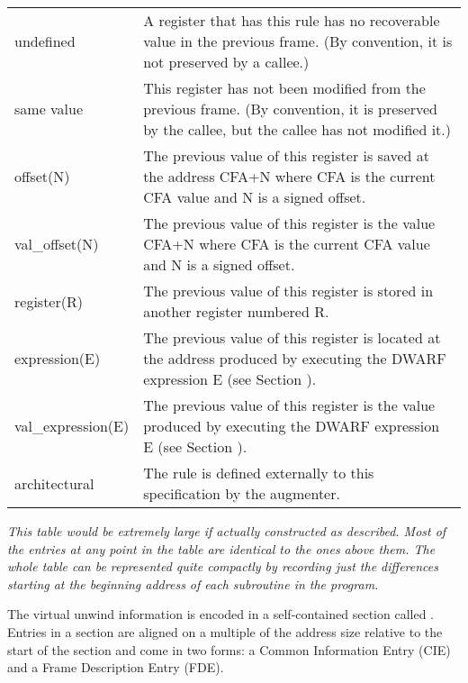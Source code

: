 \begin{longtable}{lp{8cm}}
undefined 
&A register that has this rule has no recoverable value in the previous frame.
(By convention, it is not preserved by a callee.) \\

same value
&This register has not been modified from the previous frame. (By convention,
it is preserved by the callee, but the callee has not modified it.) \\

offset(N)
&The previous value of this register is saved at the address CFA+N where CFA
is the current CFA value and N is a signed offset.\\

val\_offset(N)
&The previous value of this register is the value CFA+N where CFA is the
current CFA value and N is a signed offset.\\

register(R)
&The previous value of this register is stored 
in another register numbered R.\\

expression(E)
&The previous value of this register is located at the address produced by
executing the DWARF expression E (see Section {chap:dwarfexpressions}).\\

val\_expression(E) 
&The previous value of this register is the value produced by executing the
DWARF expression E (see Section {chap:dwarfexpressions}).\\

architectural
&The rule is defined externally to this specification by the augmenter.\\

\end{longtable}

\textit{This table would be extremely large if actually constructed
as described. Most of the entries at any point in the table
are identical to the ones above them. The whole table can be
represented quite compactly by recording just the differences
starting at the beginning address of each subroutine in
the program.}

The virtual unwind information is encoded in a self-contained
section called 
.  Entries in a 
 section
are aligned on a multiple of the address size relative to
the start of the section and come in two forms: a Common
Information Entry (CIE) and a 
Frame Description Entry (FDE).

